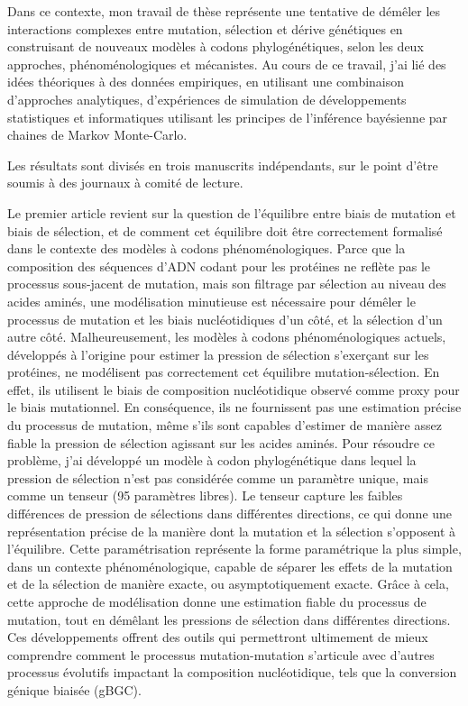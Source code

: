 Dans ce contexte, mon travail de thèse représente une tentative de démêler les interactions complexes entre mutation, sélection et dérive génétiques en construisant de nouveaux modèles à codons phylogénétiques, selon les deux approches, phénoménologiques et mécanistes.
Au cours de ce travail, j'ai lié des idées théoriques à des données empiriques, en utilisant une combinaison d'approches analytiques, d'expériences de simulation de développements statistiques et informatiques utilisant les principes de l’inférence bayésienne par chaines de Markov Monte-Carlo.

Les résultats sont divisés en trois manuscrits indépendants, sur le point d'être soumis à des journaux à comité de lecture.

Le premier article revient sur la question de l'équilibre entre biais de mutation et biais de sélection, et de comment cet équilibre doit être correctement formalisé dans le contexte des modèles à codons phénoménologiques.
Parce que la composition des séquences d'ADN codant pour les protéines ne reflète pas le processus sous-jacent de mutation, mais son filtrage par sélection au niveau des acides aminés, une modélisation minutieuse est nécessaire pour démêler le processus de mutation et les biais nucléotidiques d'un côté, et la sélection d'un autre côté.
Malheureusement, les modèles à codons phénoménologiques actuels, développés à l'origine pour estimer la pression de sélection s’exerçant sur les protéines, ne modélisent pas correctement cet équilibre mutation-sélection.
En effet, ils utilisent le biais de composition nucléotidique observé comme proxy pour le biais mutationnel.
En conséquence, ils ne fournissent pas une estimation précise du processus de mutation, même s'ils sont capables d'estimer de manière assez fiable la pression de sélection agissant sur les acides aminés.
Pour résoudre ce problème, j'ai développé un modèle à codon phylogénétique dans lequel la pression de sélection n'est pas considérée comme un paramètre unique, mais comme un tenseur (95 paramètres libres).
Le tenseur capture les faibles différences de pression de sélections dans différentes directions, ce qui donne une représentation précise de la manière dont la mutation et la sélection s'opposent à l'équilibre.
Cette paramétrisation représente la forme paramétrique la plus simple, dans un contexte phénoménologique, capable de séparer les effets de la mutation et de la sélection de manière exacte, ou asymptotiquement exacte.
Grâce à cela, cette approche de modélisation donne une estimation fiable du processus de mutation, tout en démêlant les pressions de sélection dans différentes directions.
Ces développements offrent des outils qui permettront ultimement de mieux comprendre comment le processus mutation-mutation s’articule avec d'autres processus évolutifs impactant la composition nucléotidique, tels que la conversion génique biaisée (gBGC).

